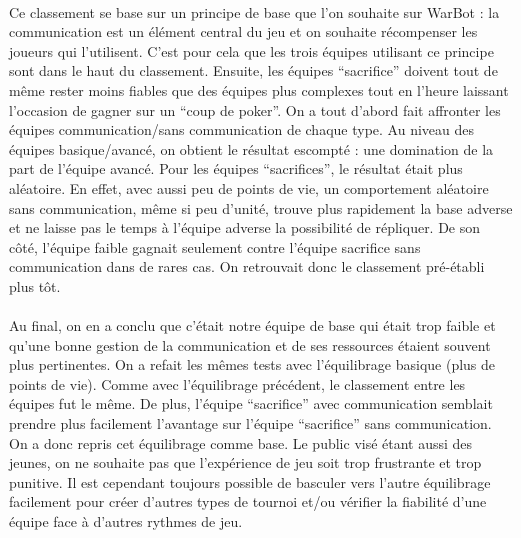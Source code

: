 \documentclass{report}
\begin{document}
\paragraph{}
  Ce classement se base sur un principe de base que l’on souhaite sur WarBot : la communication est un élément central du jeu et on souhaite récompenser les joueurs qui l’utilisent. C’est pour cela que les trois équipes utilisant ce principe sont dans le haut du classement. Ensuite, les équipes “sacrifice” doivent tout de même rester moins fiables que des équipes plus complexes tout en l’heure laissant l’occasion de gagner sur un “coup de poker”.  On a tout d’abord fait affronter les équipes communication/sans communication de chaque type. Au niveau des équipes basique/avancé, on obtient le résultat escompté : une domination de la part de l’équipe avancé. Pour les équipes “sacrifices”, le résultat était plus aléatoire. En effet, avec aussi peu de points de vie, un comportement aléatoire sans communication, même si peu d’unité, trouve plus rapidement la base adverse et ne laisse pas le temps à l’équipe adverse la possibilité de répliquer. De son côté, l’équipe faible gagnait seulement contre l’équipe sacrifice sans communication dans de rares cas. On retrouvait donc le classement pré-établi plus tôt. 
  \paragraph{}
  Au final, on en a conclu que c’était notre équipe de base qui était trop faible et qu’une bonne gestion de la communication et de ses ressources étaient souvent plus pertinentes. On a refait les mêmes tests avec l'équilibrage basique (plus de points de vie). Comme avec l’équilibrage précédent, le classement entre les équipes fut le même. De plus, l’équipe “sacrifice” avec communication semblait prendre plus facilement l'avantage sur l’équipe “sacrifice” sans communication. On a donc repris cet équilibrage comme base. Le public visé étant aussi des jeunes, on ne souhaite pas que l’expérience de jeu soit trop frustrante et trop punitive. Il est cependant toujours possible de basculer vers l’autre équilibrage facilement pour créer d’autres types de tournoi et/ou vérifier la fiabilité d’une équipe face à d’autres rythmes de jeu. 
  
\end{document}
